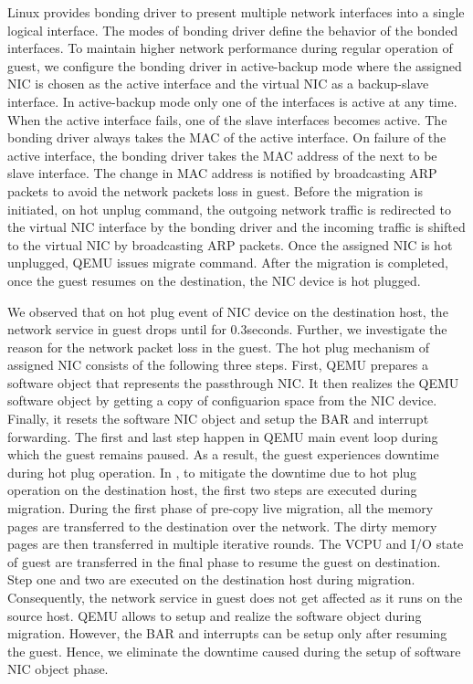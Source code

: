 Linux provides bonding driver to present multiple network
interfaces into a single logical interface. The modes of 
bonding driver define the behavior of the bonded interfaces.
To maintain higher network performance during regular
operation of guest, we configure the bonding driver in 
active-backup mode where the assigned NIC is chosen as the 
active interface and the virtual NIC as a backup-slave 
interface. In active-backup mode only one of the interfaces 
is active at any time. When the active interface fails, 
one of the slave interfaces becomes active. The bonding 
driver always takes the MAC of the active interface. On 
failure of the active interface, the bonding driver 
takes the MAC address of the next to be slave interface. 
The change in MAC address is notified by broadcasting 
ARP packets to avoid the network packets loss in guest. 
Before the migration is initiated, on hot unplug command, the 
outgoing network traffic is redirected to the virtual NIC 
interface by the bonding driver and the incoming traffic
is shifted to the virtual NIC by broadcasting ARP packets. 
Once the assigned NIC is hot unplugged, QEMU issues 
migrate command. After the migration is completed, 
once the guest resumes on the destination, the NIC 
device is hot plugged.

We observed that on hot plug event of NIC device on 
the destination host, the network service in guest drops 
until for 0.3seconds. Further, we investigate the reason for
the network packet loss in the guest. The hot plug mechanism 
of assigned NIC consists of the following three steps.
First, QEMU prepares a software object that represents 
the passthrough NIC. It then realizes the QEMU
software object by getting a copy of configuarion space from
the NIC device. Finally, it resets the software NIC object and
setup the BAR and interrupt forwarding. The first and last
step happen in QEMU main event loop during which the guest
remains paused. As a result, the guest experiences downtime
during hot plug operation. In \na, to mitigate the downtime
due to hot plug operation on the destination host, the first
two steps are executed during migration. During the first 
phase of pre-copy live migration, all the memory pages
are transferred to the destination over the network. The dirty 
memory pages are then transferred in multiple iterative rounds.
The VCPU and I/O state of guest are transferred in the final
phase to resume the guest on destination. Step one and two 
are executed on the destination host during migration. 
Consequently, the network service in guest does not get 
affected as it runs on the source host. QEMU allows 
to setup and realize the software object during migration. 
However, the BAR and interrupts can be setup only 
after resuming the guest. Hence, we eliminate the downtime 
caused during the setup of software NIC object phase.
